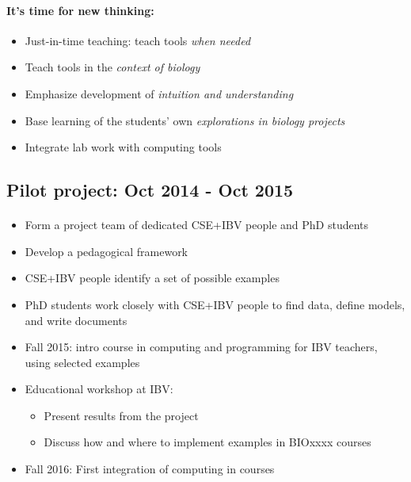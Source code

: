 \documentclass[%
twoside,                 %
final,                   %
10pt]{article}
\begin{document}
\paragraph{It's time for new thinking:}
\begin{itemize}
  \item Just-in-time teaching: teach tools \emph{when needed}

  \item Teach tools in the \emph{context of biology}

  \item Emphasize development of \emph{intuition and understanding}

  \item Base learning of the students' own \emph{explorations in biology projects}

  \item Integrate lab work with computing tools
\end{itemize}

\noindent





\subsection*{Pilot project: Oct 2014 - Oct 2015}


\paragraph{}
\begin{itemize}
 \item Form a project team of dedicated CSE+IBV people and  PhD students

 \item Develop a pedagogical framework

 \item CSE+IBV people identify a set of possible examples

 \item PhD students work closely with CSE+IBV people to find data,
   define models, and write documents

 \item Fall 2015: intro course in computing and programming for IBV teachers, using selected examples

 \item Educational workshop at IBV:
\begin{itemize}

   \item Present results from the project

   \item Discuss how and where to implement examples in BIOxxxx courses

\end{itemize}

\noindent
 \item Fall 2016: First integration of computing in courses
\end{itemize}
\end{document}
